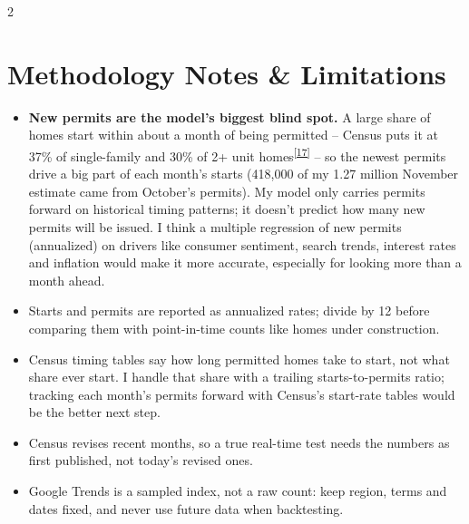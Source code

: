 \documentclass[10pt]{article}
\DeclareRobustCommand{\srcnum}[1]{\textsuperscript{\hyperlink{src#1}{[#1]}}}
\begin{document}
\begin{multicols}{2}
\section{Methodology Notes \& Limitations}
\begin{itemize}
\item \textbf{New permits are the model's biggest blind spot.} A large share of homes start within about a month of being permitted -- Census puts it at 37\% of single-family and 30\% of 2+ unit homes\srcnum{17} -- so the newest permits drive a big part of each month's starts (418,000 of my 1.27 million November estimate came from October's permits). My model only carries permits forward on historical timing patterns; it doesn't predict how many new permits will be issued. I think a multiple regression of new permits (annualized) on drivers like consumer sentiment, search trends, interest rates and inflation would make it more accurate, especially for looking more than a month ahead.
\item Starts and permits are reported as annualized rates; divide by 12 before comparing them with point-in-time counts like homes under construction.
\item Census timing tables say how long permitted homes take to start, not what share ever start. I handle that share with a trailing starts-to-permits ratio; tracking each month's permits forward with Census's start-rate tables would be the better next step.
\item Census revises recent months, so a true real-time test needs the numbers as first published, not today's revised ones.
\item Google Trends is a sampled index, not a raw count: keep region, terms and dates fixed, and never use future data when backtesting.
\end{itemize}
\end{multicols}

\clearpage

\end{document}
